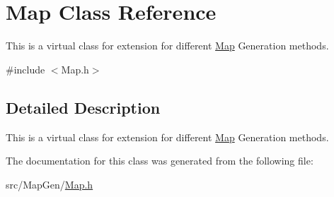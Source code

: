 \hypertarget{class_map}{}\section{Map Class Reference}
\label{class_map}


This is a virtual class for extension for different \mbox{\hyperlink{class_map}{Map}} Generation methods.  




{\ttfamily \#include $<$Map.\+h$>$}



\subsection{Detailed Description}
This is a virtual class for extension for different \mbox{\hyperlink{class_map}{Map}} Generation methods. 

The documentation for this class was generated from the following file\+:\begin{DoxyCompactItemize}
\item 
src/\+Map\+Gen/\mbox{\hyperlink{_map_8h}{Map.\+h}}\end{DoxyCompactItemize}
